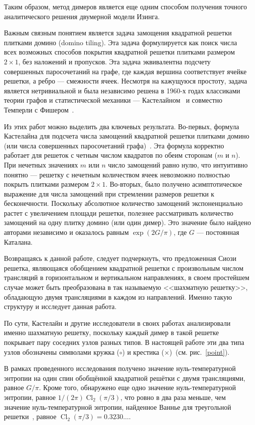 \documentclass[utf8,12pt]{jetp}
\DeclareMathOperator{\Cl}{Cl}
\begin{document}
Таким образом, метод димеров является еще одним способом получения точного аналитического решения двумерной модели Изинга.

Важным связным понятием является задача замощения квадратной решетки плитками домино (domino tiling). Эта задача формулируется как поиск числа всех возможных способов покрытия квадратной решетки плитками размером $2 \times 1$, без наложений и пропусков. Эта задача эквивалентна подсчету совершенных паросочетаний на графе, где каждая вершина соответствует ячейке решетки, а ребро — смежности ячеек. Несмотря на кажущуюся простоту, задача является нетривиальной и была независимо решена в 1960-х годах классиками теории графов и статистической механики — Кастелайном~\cite{kasteleyn1961} и совместно Темперли с Фишером~\cite{temperley1961}.

Из этих работ можно выделить два ключевых результата. Во-первых, формула Кастелайна для подсчета числа замощений квадратной решетки плитками домино (или числа совершенных паросочетаний графа)~\cite{kasteleyn1961}. Эта формула корректно работает для решеток с четным числом квадратов по обеим сторонам ($m$ и $n$). При нечетных значениях $m$ или $n$ число замощений равно нулю, что интуитивно понятно — решетку с нечетным количеством ячеек невозможно полностью покрыть плитками размером $2 \times 1$. Во-вторых, было получено асимптотическое выражение для числа замощений при стремлении размеров решетки к бесконечности. Поскольку абсолютное количество замощений экспоненциально растет с увеличением площади решетки, полезнее рассматривать количество замощений на одну плитку домино (или один димер). Это значение было найдено авторами независимо и оказалось равным $\exp (2G/\pi)$, где $G$ — постоянная Каталана.

Возвращаясь к данной работе, следует подчеркнуть, что предложенная Сиози~\cite{syozi1972} решетка, являющаяся обобщением квадратной решетки с произвольным числом трансляций в горизонтальном и вертикальном направлениях, в своем простейшем случае может быть преобразована в так называемую <<шахматную решетку>>, обладающую двумя трансляциями в каждом из направлений. Именно такую структуру и исследует данная работа.

По сути, Кастелайн и другие исследователи в своих работах анализировали именно шахматную решетку, поскольку каждый димер в такой решетке покрывает пару соседних узлов разных типов. В настоящей работе эти два типа узлов обозначены символами кружка ($\circ$) и крестика ($\times$)~(см. рис.~\ref{point}).

В рамках проведенного исследования получено значение нуль-температурной энтропии на один спин обобщённой квадратной решётки с двумя трансляциями, равное $G/\pi$. Кроме того, обнаружено еще одно значение нуль-температурной энтропии, равное $1/(2\pi)\Cl_2(\pi/3)$, что ровно в два раза меньше, чем значение нуль-температурной энтропии, найденное Ваннье для треугольной решетки~\cite{wannier1950}, равное $\Cl_2(\pi/3) = 0.3230\dots$.
\end{document}
